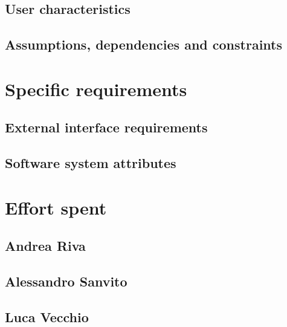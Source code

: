 \documentclass[10pt,english, openany]{book}
\begin{document}


\section{User characteristics}



\section{Assumptions, dependencies and constraints}



\chapter{Specific requirements}

\section{External interface requirements}



\section{Software system attributes}



\chapter{Effort spent}

\section{Andrea Riva}



\section{Alessandro Sanvito}



\section{Luca Vecchio}



\pagebreak
\end{document}
